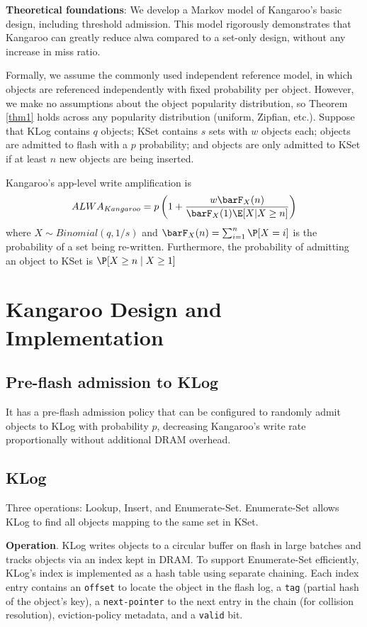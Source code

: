 \documentclass[11pt]{article}
\begin{document}
\textbf{Theoretical foundations}: We develop a Markov model of Kangaroo’s basic design, including threshold
 admission. This model rigorously demonstrates that Kangaroo can greatly reduce alwa compared to a
 set-only design, without any increase in miss ratio.

Formally, we assume the commonly used independent reference model, in which objects are referenced
independently with fixed probability per object. However, we make no assumptions about the object
popularity distribution, so Theorem \ref{thm1} holds across any popularity distribution (uniform,
Zipfian, etc.). Suppose that KLog contains \(q\) objects; KSet contains \(s\) sets with \(w\) objects
each; objects are admitted to flash with a \(p\) probability; and objects are only admitted to KSet
if at least \(n\) new objects are being inserted.

\begin{theorem}[]
\label{thm1}
Kangaroo's app-level write amplification is
 \begin{equation*}
ALWA_{Kangaroo}=p\left( 1+\frac{w\barF_X(n)}{\barF_X(1)\E[X|X\ge n]} \right)
 \end{equation*}
where \(X\sim Binomial(q,1/s)\) and \(\barF_X(n)=\sum_{i=1}^n\P[X=i]\) is the probability of a set
being re-written. Furthermore, the probability of admitting an object to KSet is
\(\P[X\ge n\mid X\ge 1]\)
\end{theorem}
\section{Kangaroo Design and Implementation}
\label{sec:org2f5888b}
\subsection{Pre-flash admission to KLog}
\label{sec:org3484dab}
It has a pre-flash admission policy that can be configured to randomly admit objects to KLog with
probability \(p\), decreasing Kangaroo’s write rate proportionally without additional DRAM overhead.
\subsection{KLog}
\label{sec:org4f1091d}
Three operations: Lookup, Insert, and Enumerate-Set. Enumerate-Set allows KLog to find all objects
mapping to the same set in KSet.

\textbf{Operation}. KLog writes objects to a circular buffer on flash in large batches and tracks objects via
an index kept in DRAM. To support Enumerate-Set efficiently, KLog’s index is implemented as a hash
table using separate chaining. Each index entry contains an \texttt{offset} to locate the object in the flash
log, a \texttt{tag} (partial hash of the object’s key), a \texttt{next-pointer} to the next entry in the chain (for
collision resolution), eviction-policy metadata, and a \texttt{valid} bit.
\end{document}
